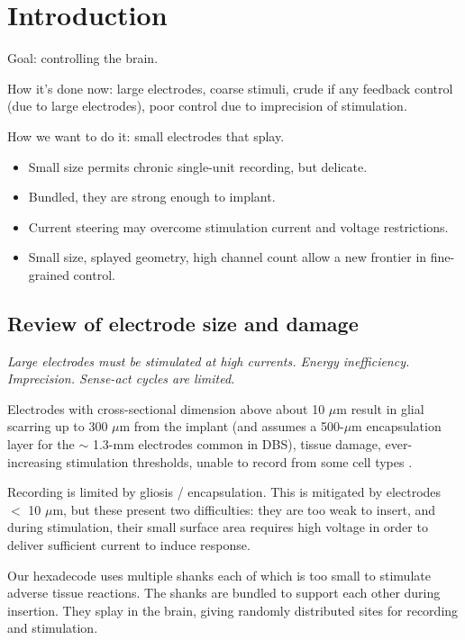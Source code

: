 \documentclass[10pt,letterpaper]{article}
\begin{document}
\linenumbers

\section{Introduction}

Goal: controlling the brain.

How it's done now: large electrodes, coarse stimuli, crude if any
feedback control (due to large electrodes), poor control due to
imprecision of stimulation.

How we want to do it: small electrodes that splay.
\begin{itemize}
\item Small size permits chronic single-unit recording, but delicate.
\item Bundled, they are strong enough to implant.
\item Current steering may overcome stimulation current and voltage restrictions.
\item Small size, splayed geometry, high channel count allow a new frontier in fine-grained control.
\end{itemize}


\subsection{Review of electrode size and damage}

{\em Large electrodes must be stimulated at high currents.  Energy inefficiency.  Imprecision.  Sense-act cycles are limited.}

Electrodes with cross-sectional dimension above about 10 $\mu$m result
in glial scarring up to 300 $\mu$m from the implant (and
\cite{Butson2008steering} assumes a 500-$\mu$m encapsulation layer for
the $\sim$ 1.3-mm electrodes common in DBS), tissue damage,
ever-increasing stimulation thresholds, unable to record from some
cell types
\cite{Biran2005gliosis,Polikov2005gliosis,Winslow2010gliosis}.

Recording is limited by gliosis / encapsulation.  This is mitigated by
electrodes $<$ 10 $\mu$m, but these present two difficulties: they are
too weak to insert, and during stimulation, their small surface area
requires high voltage in order to deliver sufficient current to induce
response.

Our hexadecode \cite{Guitchounts2013electrode} uses multiple shanks
each of which is too small to stimulate adverse tissue reactions.  The
shanks are bundled to support each other during insertion.  They splay
in the brain, giving randomly distributed sites for recording and
stimulation.
\end{document}
